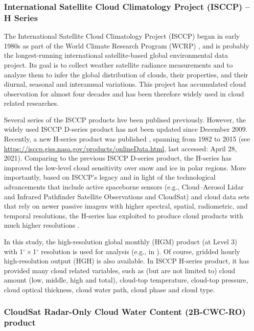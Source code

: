 \subsubsection{International Satellite Cloud Climatology Project (ISCCP) -- H Series}

The International Satellite Cloud Climatology Project (ISCCP) began in early 1980s as part of the World Climate Research Program (WCRP) \citep{Schiffer1983,Rossow1991}, and is probably the longest-running international satellite-based global environmental data project. Its goal is to collect weather satellite radiance measurements and to analyze them to infer the global distribution of clouds, their properties, and their diurnal, seasonal and interannual variations. This project has accumulated cloud observation for almost four decades and has been therefore widely used in cloud related researches.

Several series of the ISCCP products hve been publised previously. However, the widely used ISCCP D-series product \citep{Rossow1999advances} has not been updated since December 2009. Recently, a new H-series product was published \citep{Young2018}, spanning from 1982 to 2015 (see \url{https://isccp.giss.nasa.gov/products/onlineData.html}, last accessed: April 28, 2021). Comparing to the previous ISCCP D-series product, the H-series has improved the low-level cloud sensitivity over snow and ice in polar regions. More importantly, based on ISCCP’s legacy and in light of the technological advancements that include active spaceborne sensors (e.g., Cloud–Aerosol Lidar and Infrared Pathfinder Satellite Observations and CloudSat) and cloud data sets that rely on newer passive imagers with higher spectral, spatial, radiometric, and temporal resolutions, the H-series has exploited to produce cloud products with much higher resolutions \citep{Young2018}.

In this study, the high-resolution global monthly (HGM) product (at Level 3) with 1$^\circ \times$1$^\circ$ resolution is used for analysis (e.g., in ). Of course, gridded hourly high-resolution output (HGH) is also available. In ISCCP H-series product, it has provided many cloud related variables, such as (but are not limited to) cloud amount (low, middle, high and total), cloud-top temperature, cloud-top pressure, cloud optical thickness, cloud water path, cloud phase and cloud type.

\subsubsection{CloudSat Radar-Only Cloud Water Content (2B-CWC-RO) product}

